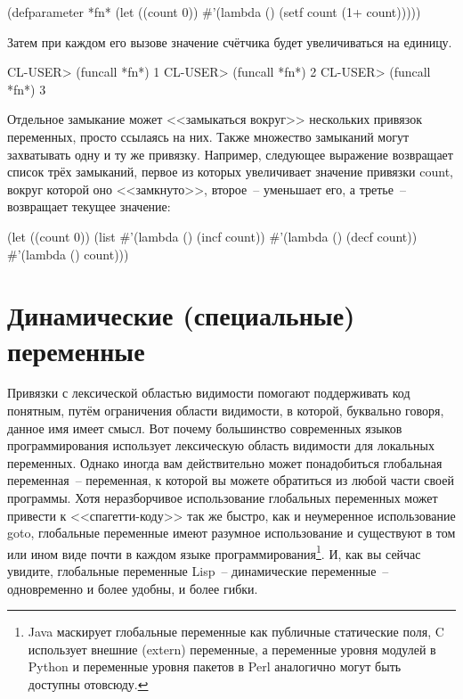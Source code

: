 \begin{myverb}
  (defparameter *fn* (let ((count 0)) #'(lambda () (setf count (1+ count)))))
\end{myverb}

Затем при каждом его вызове значение счётчика будет увеличиваться на единицу.

\begin{myverb}
  CL-USER> (funcall *fn*)
  1
  CL-USER> (funcall *fn*)
  2
  CL-USER> (funcall *fn*)
  3
\end{myverb}

Отдельное замыкание может <<замыкаться вокруг>> нескольких привязок переменных, просто
ссылаясь на них. Также множество замыканий могут захватывать одну и ту же
привязку. Например, следующее выражение возвращает список трёх замыканий, первое из
которых увеличивает значение привязки count, вокруг которой оно <<замкнуто>>, второе~--
уменьшает его, а третье~-- возвращает текущее значение:

\begin{myverb}
  (let ((count 0))
    (list
     #'(lambda () (incf count))
     #'(lambda () (decf count))
     #'(lambda () count)))
\end{myverb}

\section{Динамические (специальные) переменные}

Привязки с лексической областью видимости помогают поддерживать код понятным, путём
ограничения области видимости, в которой, буквально говоря, данное имя имеет смысл. Вот
почему большинство современных языков программирования использует лексическую область
видимости для локальных переменных. Однако иногда вам действительно может понадобиться
глобальная переменная~-- переменная, к которой вы можете обратиться из любой части своей
программы. Хотя неразборчивое использование глобальных переменных может привести к
<<спагетти-коду>> так же быстро, как и неумеренное использование goto, глобальные переменные
имеют разумное использование и существуют в том или ином виде почти в каждом языке
программирования\footnote{Java маскирует глобальные переменные как публичные статические
  поля, C использует внешние (extern) переменные, а переменные уровня модулей в Python и
  переменные уровня пакетов в Perl аналогично могут быть доступны отовсюду.}. И, как вы
сейчас увидите, глобальные переменные Lisp~-- динамические переменные~-- одновременно и
более удобны, и более гибки.

